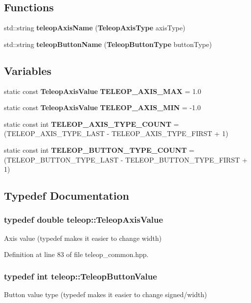 \subsection*{Functions}
\begin{DoxyCompactItemize}
\item 
std::string {\bf teleopAxisName} ({\bf TeleopAxisType} axisType)
\item 
std::string {\bf teleopButtonName} ({\bf TeleopButtonType} buttonType)
\end{DoxyCompactItemize}
\subsection*{Variables}
\begin{DoxyCompactItemize}
\item 
static const {\bf TeleopAxisValue} {\bf TELEOP\_\-AXIS\_\-MAX} = 1.0
\item 
static const {\bf TeleopAxisValue} {\bf TELEOP\_\-AXIS\_\-MIN} = -\/1.0
\item 
static const int {\bf TELEOP\_\-AXIS\_\-TYPE\_\-COUNT} = (TELEOP\_\-AXIS\_\-TYPE\_\-LAST -\/ TELEOP\_\-AXIS\_\-TYPE\_\-FIRST + 1)
\item 
static const int {\bf TELEOP\_\-BUTTON\_\-TYPE\_\-COUNT} = (TELEOP\_\-BUTTON\_\-TYPE\_\-LAST -\/ TELEOP\_\-BUTTON\_\-TYPE\_\-FIRST + 1)
\end{DoxyCompactItemize}


\subsection{Typedef Documentation}
\subsubsection[{TeleopAxisValue}]{\setlength{\rightskip}{0pt plus 5cm}typedef double {\bf teleop::TeleopAxisValue}}\label{namespaceteleop_a76a980352ec9e25c22a88993b56e7085}
Axis value (typedef makes it easier to change width) 

Definition at line 83 of file teleop\_\-common.hpp.

\subsubsection[{TeleopButtonValue}]{\setlength{\rightskip}{0pt plus 5cm}typedef int {\bf teleop::TeleopButtonValue}}\label{namespaceteleop_ac4714f8484c4ca73ffa50a497ae50032}
Button value type (typedef makes it easier to change signed/width) 

